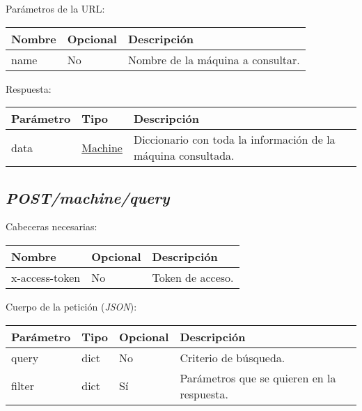 Parámetros de la URL:
\begin{table}[h!]
	\centering
	\begin{adjustbox}{max width=\textwidth}
	\begin{tabular}{|l|l|l|}
		\hline
		Nombre & Opcional & Descripción \\ \hline
		name & No & Nombre de la máquina a consultar. \\ \hline
	\end{tabular}
\end{adjustbox}
\end{table}

Respuesta:
\begin{table}[h!]
	\centering
	\begin{adjustbox}{max width=\textwidth}
	\begin{tabularx}{\linewidth}{|l|l|L|}
		\hline
		Parámetro & Tipo & Descripción \\ \hline
		data & \hyperref[sec:maquina]{Machine} & Diccionario con toda la información de la máquina consultada. \\ \hline
	\end{tabularx}
\end{adjustbox}
\end{table}



\subsection{\textit{POST/machine/query}}

Cabeceras necesarias:
\begin{table}[h!]
	\centering
	\begin{adjustbox}{max width=\textwidth}
	\begin{tabular}{|l|l|l|}
		\hline
		Nombre & Opcional & Descripción \\ \hline
		x-access-token & No & Token de acceso. \\ \hline
	\end{tabular}
\end{adjustbox}
\end{table}

Cuerpo de la petición (\textit{JSON}):
\begin{table}[h!]
	\centering
	\begin{adjustbox}{max width=\textwidth}
	\begin{tabular}{|l|l|l|l|}
		\hline
		Parámetro & Tipo & Opcional & Descripción \\ \hline
		query & dict & No & Criterio de búsqueda. \\ \hline
		filter & dict & Sí & Parámetros que se quieren en la respuesta. \\ \hline
	\end{tabular}
\end{adjustbox}
\end{table}

